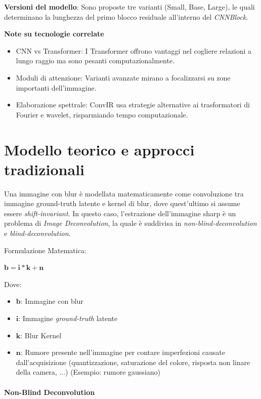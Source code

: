 \documentclass[a4paper,10pt,twocolumn]{article}
\begin{document}
\textbf{Versioni del modello}\cite{convir}: Sono proposte tre varianti (Small, Base, Large), le quali determinano la lunghezza del primo blocco residuale
all'interno del \textit{CNNBlock}.

\textbf{Note su tecnologie correlate}
\begin{itemize}[topsep=0pt, noitemsep]
  \item CNN vs Transformer: I Transformer offrono vantaggi nel cogliere relazioni a lungo raggio ma sono pesanti computazionalmente.
  \item Moduli di attenzione: Varianti avanzate mirano a focalizzarsi su zone importanti dell'immagine.
  \item Elaborazione spettrale: ConvIR usa strategie alternative ai trasformatori di Fourier e wavelet, risparmiando tempo computazionale.
\end{itemize}

\section{Modello teorico e approcci tradizionali}

Una immagine con blur \`e modellata matematicamente come convoluzione tra immagine ground-truth latente e kernel di blur, dove quest'ultimo si assume essere \textit{\gls{shift-invariant}}. In questo caso,
l'estrazione dell'immagine sharp \`e un problema di \textit{Image Deconvolution}, la quale \`e suddivisa in \textit{\Gls{non-blind-deconvolution}} e \textit{\Gls{blind-deconvolution}}.\par
Formulazione Matematica:

\begin{math}
  \bm{b} = \bm{i} * \bm{k} + \bm{n}
\end{math}

Dove:

\begin{itemize}[topsep=0pt, noitemsep]
  \item[] $\bm{b}$: Immagine con blur
  \item[] $\bm{i}$: Immagine \textit{ground-truth} latente
  \item[] $\bm{k}$: Blur Kernel
  \item[] $\bm{n}$: Rumore presente nell'immagine per contare imperfezioni causate dall'acquisizione (quantizzazione, saturazione del colore, risposta non linare della camera, ...) (Esempio: rumore gaussiano)
\end{itemize}

\paragraph*{Non-Blind Deconvolution}
\end{document}
